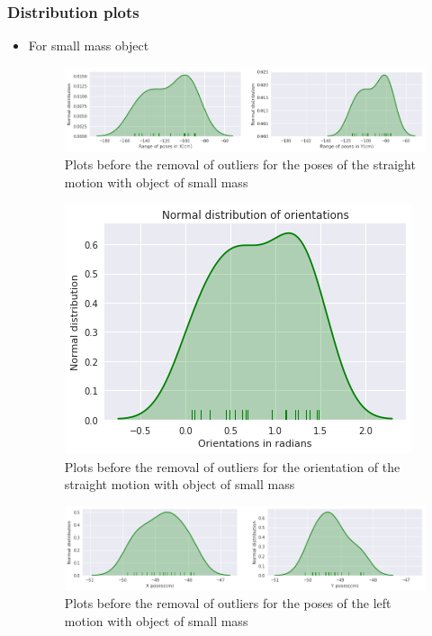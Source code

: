 \documentclass[11pt,a4paper]{article}
\begin{document}
				\subsubsection{Distribution plots}
				\begin{itemize}
				\item For small mass object
				\begin{figure}[H]
					\centering
					\includegraphics[scale=0.52]{str_small}
					\caption{Plots before the removal of outliers for the poses of the straight motion with object of small mass}			
				\end{figure}
				\begin{figure}[H]
					\centering
					\includegraphics[scale=0.6]{str_o_small}
					\caption{Plots before the removal of outliers for the orientation of the straight motion with object of small mass}			
				\end{figure}
				\begin{figure}[H]
					\centering
					\includegraphics[scale=0.52]{small_str_left}
					\caption{Plots before the removal of outliers for the poses of the left motion with object of small mass}			
				\end{figure}

\end{itemize}
\end{document}
